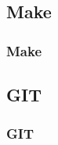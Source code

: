 {\begin{frame}[fragile]
\end{frame}

\subsection{Make}
\begin{frame}[fragile]
  \frametitle{Make}
  \vspace{3mm}
  
\end{frame}

\subsection{GIT}
\begin{frame}[fragile]
  \frametitle{GIT}
  \vspace{3mm}
  
\end{frame}

}


